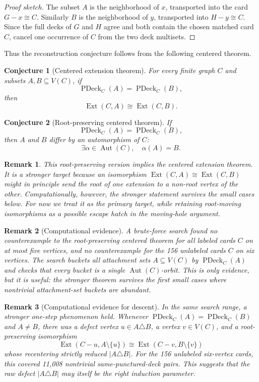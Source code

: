 \documentclass[11pt]{article}
\newtheorem{conjecture}{Conjecture}
\newtheorem{remark}{Remark}
\newcommand{\PDeck}{\operatorname{PDeck}}
\newcommand{\Ext}{\operatorname{Ext}}
\newcommand{\Aut}{\operatorname{Aut}}
\begin{document}
\begin{proof}[Proof sketch]
The subset \(A\) is the neighborhood of \(x\), transported into the card
\(G-x \cong C\).  Similarly \(B\) is the neighborhood of \(y\), transported
into \(H-y \cong C\).  Since the full decks of \(G\) and \(H\) agree and both
contain the chosen matched card \(C\), cancel one occurrence of \(C\) from the
two deck multisets.
\end{proof}

Thus the reconstruction conjecture follows from the following centered theorem.

\begin{conjecture}[Centered extension theorem]
For every finite graph \(C\) and subsets \(A,B \subseteq V(C)\), if
\[
  \PDeck_C(A) = \PDeck_C(B),
\]
then
\[
  \Ext(C,A) \cong \Ext(C,B).
\]
\end{conjecture}

\begin{conjecture}[Root-preserving centered theorem]
If
\[
  \PDeck_C(A) = \PDeck_C(B),
\]
then \(A\) and \(B\) differ by
an automorphism of \(C\):
\[
  \exists \alpha \in \Aut(C), \quad \alpha(A)=B.
\]
\end{conjecture}

\begin{remark}
This root-preserving version implies the centered extension theorem.  It is a
stronger target because an isomorphism
\(\Ext(C,A) \cong \Ext(C,B)\) might in principle send the root of one extension
to a non-root vertex of the other.  Computationally, however, the stronger
statement survives the small cases below.  For now we treat it as the primary
target, while retaining root-moving isomorphisms as a possible escape hatch in
the moving-hole argument.
\end{remark}

\begin{remark}[Computational evidence]
A brute-force search found no counterexample to the root-preserving centered
theorem for all labeled cards \(C\) on at most five vertices, and no
counterexample for the 156 unlabeled cards \(C\) on six vertices.  The search
buckets all attachment sets \(A\subseteq V(C)\) by \(\PDeck_C(A)\) and checks
that every bucket is a single \(\Aut(C)\)-orbit.  This is only evidence, but it
is useful: the stronger theorem survives the first small cases where nontrivial
attachment-set buckets are abundant.
\end{remark}

\begin{remark}[Computational evidence for descent]
In the same search range, a stronger one-step phenomenon held.  Whenever
\(\PDeck_C(A)=\PDeck_C(B)\) and \(A\neq B\), there was a defect vertex
\(u\in A\triangle B\), a vertex \(v\in V(C)\), and a root-preserving
isomorphism
\[
  \Ext(C-u,A\setminus\{u\})
  \cong
  \Ext(C-v,B\setminus\{v\})
\]
whose recentering strictly reduced \(|A\triangle B|\).  For the 156 unlabeled
six-vertex cards, this covered 11,008 nontrivial same-punctured-deck pairs.
This suggests that the raw defect \(|A\triangle B|\) may itself be the right
induction parameter.
\end{remark}
\end{document}
